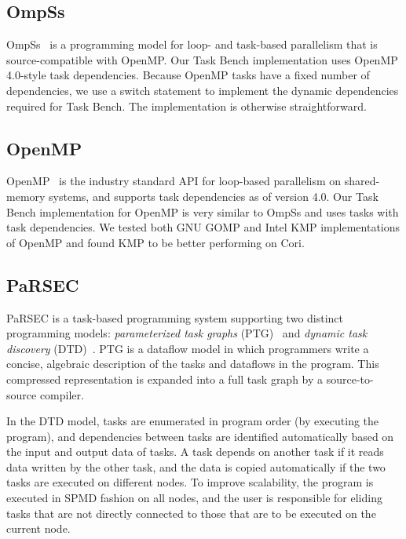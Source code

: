 \subsection{OmpSs}

OmpSs~\cite{OmpSs11} is a programming model for loop- and task-based parallelism
that is source-compatible with OpenMP. Our Task Bench implementation
uses OpenMP 4.0-style task dependencies. Because OpenMP tasks have a fixed number of dependencies, we use a switch
statement to implement the dynamic dependencies required for Task
Bench. The implementation is otherwise straightforward.


\subsection{OpenMP}

OpenMP~\cite{OpenMPSpec40} is the industry standard API for loop-based
parallelism on shared-memory systems, and supports task dependencies as of version 4.0. Our Task Bench implementation
for OpenMP is very similar to OmpSs and uses tasks with
task dependencies. We tested both GNU GOMP and Intel KMP
implementations of OpenMP and found KMP to be better performing on Cori.

\subsection{PaRSEC}

PaRSEC is a task-based programming system supporting two distinct
programming models: \emph{parameterized task graphs}
(PTG)~\cite{PARSEC13} and \emph{dynamic task discovery}
(DTD)~\cite{PARSEC_DTD}.  PTG is a dataflow model in which programmers
write a concise, algebraic description of the tasks and dataflows in
the program. This compressed representation is expanded into a full
task graph by a source-to-source compiler.

In the DTD model, tasks are enumerated in program order (by
executing the program), and dependencies between tasks are
identified automatically based on the input and output data of tasks. 
A task depends on another task if it reads data written by the other task,
and the data is copied automatically if the two tasks are executed on
different nodes. To
improve scalability, the program is executed in
SPMD fashion on all nodes, and the user is responsible for eliding
tasks that are not directly connected to those that are to be executed
on the current node.

